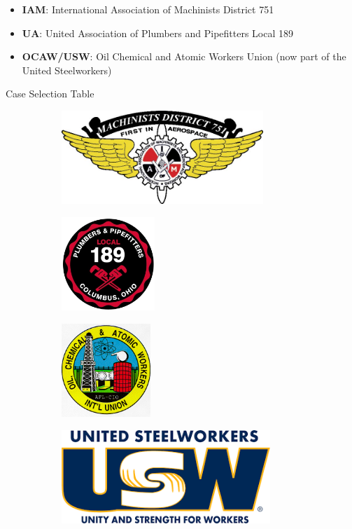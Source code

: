 \documentclass{beamer}
\begin{document}
\begin{frame}
\vfill

	\begin{itemize}
			\item \textbf{IAM}: International Association of Machinists District 751
			\item \textbf{UA}: United Association of Plumbers and Pipefitters Local 189
			\item \textbf{OCAW/USW}: Oil Chemical and Atomic Workers Union (now part of the United Steelworkers)
	\end{itemize}
\end{frame}


\begin{frame}{Case Selection Table}
\begin{figure}
\begin{subfigure}[th!]{0.2\linewidth}
  \centering 
  \includegraphics[height=100pt]{IAM_751}
\end{subfigure}
\begin{subfigure}[th!]{0.2\linewidth}
  \centering
  \includegraphics[height=100pt]{UA_189}
\end{subfigure}%
\begin{subfigure}[th!]{0.2\linewidth}
  \centering
  \includegraphics[height=100pt]{OCAW}
\end{subfigure}
\begin{subfigure}[th!]{0.2\linewidth}
  \centering
  \includegraphics[height=100pt]{USW}
\end{subfigure}%
\end{figure}


\end{frame}
\end{document}
